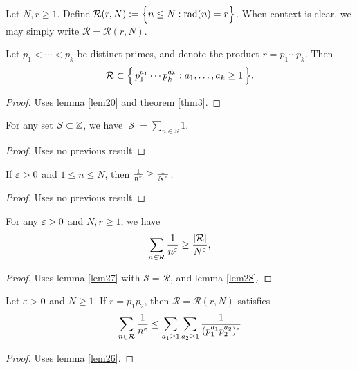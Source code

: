 \begin{definition} \label{def25} \leanok
Let $N,r\ge1$. Define $\mathcal{R}(r,N):= \Bigl\{ n\le N : \operatorname{rad}(n)=r \Bigr\}$. When context is clear, we may simply write $\mathcal{R}=\mathcal{R}(r,N)$.
\end{definition}

\begin{lemma} \label{lem26} 
Let $p_1<\cdots<p_k$ be distinct primes, and denote the product $r = p_1 \cdots p_k$. Then
\[
\mathcal{R} \subset \Bigl\{\, p_1^{a_1}\cdots p_k^{a_k} : a_1,\dots,a_k\ge1\,\Bigr\}.
\]
\end{lemma}
\begin{proof}\leanok
{}
Uses lemma \ref{lem20} and theorem \ref{thm3}.
\end{proof}

\begin{lemma} \label{lem27} 
For any set $\mathcal S\subset {\mathbb Z}$, we have $|\mathcal S| = \sum_{n\in S}1$.
\end{lemma}
\begin{proof}\leanok
\uses{}
Uses no previous result
\end{proof}

\begin{lemma} \label{lem28} 
If $\varepsilon>0$ and $1\le n\le N$, then $\frac{1}{n^{\varepsilon}} \ge \frac{1}{N^{\varepsilon}}$.
\end{lemma}
\begin{proof}\leanok
\uses{}
Uses no previous result
\end{proof}

\begin{lemma} \label{lem29} 
For any $\varepsilon>0$ and $N,r\ge1$, we have
\[
\sum_{n\in \mathcal{R}}\frac{1}{n^{\varepsilon}} \ge \frac{|\mathcal{R}|}{N^\varepsilon},
\]
\end{lemma}
\begin{proof}\leanok
{}
Uses lemma \ref{lem27} with $\mathcal S=\mathcal R$, and lemma \ref{lem28}.
\end{proof}

\begin{lemma} \label{lem30}
Let $\varepsilon>0$ and $N\ge1$. If $r=p_1p_2$, then $\mathcal{R} = \mathcal{R}(r,N)$ satisfies
\[
\sum_{n\in \mathcal{R}}\frac{1}{n^{\varepsilon}} 
\le \sum_{a_1\ge1}\sum_{a_2\ge1} \frac{1}{(p_1^{a_1}p_2^{a_2})^\varepsilon}
\]
\end{lemma}
\begin{proof}\leanok
{}
Uses lemma \ref{lem26}.
\end{proof}

